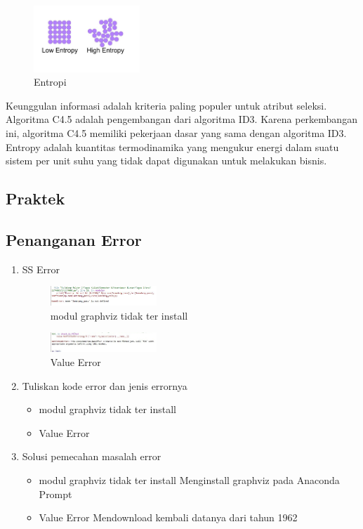 \begin{enumerate}
	\hfill\break
	\begin{figure}[H]
		\includegraphics[width=4cm]{figures/1174003/2/entropi.jpg}
		\centering
		\caption{Entropi}
	\end{figure}
	\hfill\break
	Keunggulan informasi adalah kriteria paling populer untuk atribut seleksi. Algoritma C4.5 adalah pengembangan dari algoritma ID3. 
	Karena perkembangan ini, algoritma C4.5 memiliki pekerjaan dasar yang sama dengan algoritma ID3.
	Entropy adalah kuantitas termodinamika yang mengukur energi dalam suatu sistem per unit suhu yang tidak dapat digunakan untuk melakukan bisnis.
\end{enumerate}
\subsection{Praktek}

\subsection{Penanganan Error}
\begin{enumerate}
	\item SS Error
	\hfill\break
	\begin{figure}[H]
		\includegraphics[width=4cm]{figures/1174003/2/error/1.JPG}
		\centering
		\caption{modul graphviz tidak ter install}
	\end{figure}
	\begin{figure}[H]
		\includegraphics[width=4cm]{figures/1174003/2/error/2.JPG}
		\centering
		\caption{Value Error}
	\end{figure}
	\item Tuliskan kode error dan jenis errornya
	\hfill\break
	\begin{itemize}
		\item modul graphviz tidak ter install
		\item Value Error
	\end{itemize}
	\item Solusi pemecahan masalah error
	\hfill\break
	\begin{itemize}
		\item modul graphviz tidak ter install
		\hfill\break
		Menginstall graphviz pada Anaconda Prompt
		\item Value Error
		\hfill\break
		Mendownload kembali datanya dari tahun 1962
	\end{itemize}
\end{enumerate}
